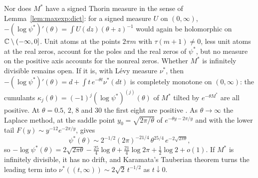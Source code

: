 Nor does $M^*$ have a signed Thorin measure in the sense of Lemma~\ref{lem:maxexp:dict}: for a signed measure $U$ on $(0,\infty)$, $-(\log\psi^*)'(\theta)=\int U(dz)(\theta+z)^{-1}$ would again be holomorphic on $\mathbb{C}\setminus(-\infty,0]$. Unit atoms at the points $2\pi m$ with $\tau(m+1)\ne0$, less unit atoms at the real zeros, account for the poles and the real zeros of $\psi^*$, but no measure on the positive axis accounts for the nonreal zeros. Whether $M^*$ is infinitely divisible remains open. If it is, with L\'evy measure $\nu^*$, then $-(\log\psi^*)'(\theta)=d+\int t\,e^{-\theta t}\nu^*(dt)$ is completely monotone on $(0,\infty)$: the cumulants $\kappa_j(\theta)=(-1)^j(\log\psi^*)^{(j)}(\theta)$ of $M^*$ tilted by $e^{-\theta M^*}$ are all positive. At $\theta=0.5$, $2$, $8$ and $30$ the first eight are positive \cite{P26max}. As $\theta\to\infty$ the Laplace method, at the saddle point $y_0=\sqrt{2\pi/\theta}$ of $e^{-\theta y-2\pi/y}$ and with the lower tail $F(y)\sim y^{-12}e^{-2\pi/y}$, gives
\[
\psi^*(\theta)\sim2^{-1/2}(2\pi)^{-21/4}\,\theta^{25/4}\,e^{-2\sqrt{2\pi\theta}},
\]
so $-\log\psi^*(\theta)=2\sqrt{2\pi\theta}-\frac{25}4\log\theta+\frac{21}4\log2\pi+\frac12\log2+o(1)$. If $M^*$ is infinitely divisible, it has no drift, and Karamata's Tauberian theorem turns the leading term into $\nu^*((t,\infty))\sim2\sqrt2\,t^{-1/2}$ as $t\downarrow0$.

